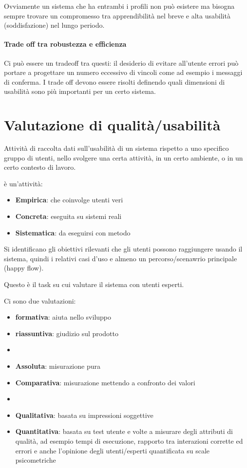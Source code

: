 \documentclass[11pt,a4paper]{book}
\begin{document}
Ovviamente un sistema che ha entrambi i profili non può esistere ma bisogna sempre trovare un compromesso tra apprendibilità nel breve e alta usabilità (soddisfazione) nel lungo periodo.

\subsubsection{Trade off tra robustezza e efficienza}
Ci può essere un tradeoff tra questi: il desiderio di evitare all'utente errori può portare a progettare un numero eccessivo di vincoli come ad esempio i messaggi di conferma. I trade off devono essere risolti definendo quali dimensioni di usabilità sono più importanti per un certo sistema.

\chapter{Valutazione di qualità/usabilità}
Attività di raccolta dati sull'usabilità di un sistema rispetto a uno specifico gruppo di utenti, nello svolgere una certa attività, in un certo ambiente, o in un certo contesto di lavoro. 

è un'attività:
\begin{itemize}
	\item \textbf{Empirica}: che coinvolge utenti veri
	\item \textbf{Concreta}: eseguita su sistemi reali
	\item \textbf{Sistematica}: da eseguirsi con metodo
\end{itemize}

Si identificano gli obiettivi rilevanti che gli utenti possono raggiungere usando il sistema, quindi i relativi casi d'uso e almeno un percorso/scenawrio principale (happy flow).

Questo è il task su cui valutare il sistema con utenti esperti.

Ci sono due valutazioni:
\begin{itemize}
	\item \textbf{formativa}: aiuta nello sviluppo
	\item \textbf{riassuntiva}: giudizio sul prodotto
	\item[]
	\item \textbf{Assoluta}: misurazione pura
	\item \textbf{Comparativa}: misurazione mettendo a confronto dei valori
	\item[]	
	\item \textbf{Qualitativa}: basata su impressioni soggettive
	\item \textbf{Quantitativa}: basata su test utente e volte a misurare degli attributi di qualità, ad esempio tempi di esecuzione, rapporto tra interazioni corrette ed errori e anche l'opinione degli utenti/esperti quantificata su scale psicometriche
\end{itemize}
\end{document}
